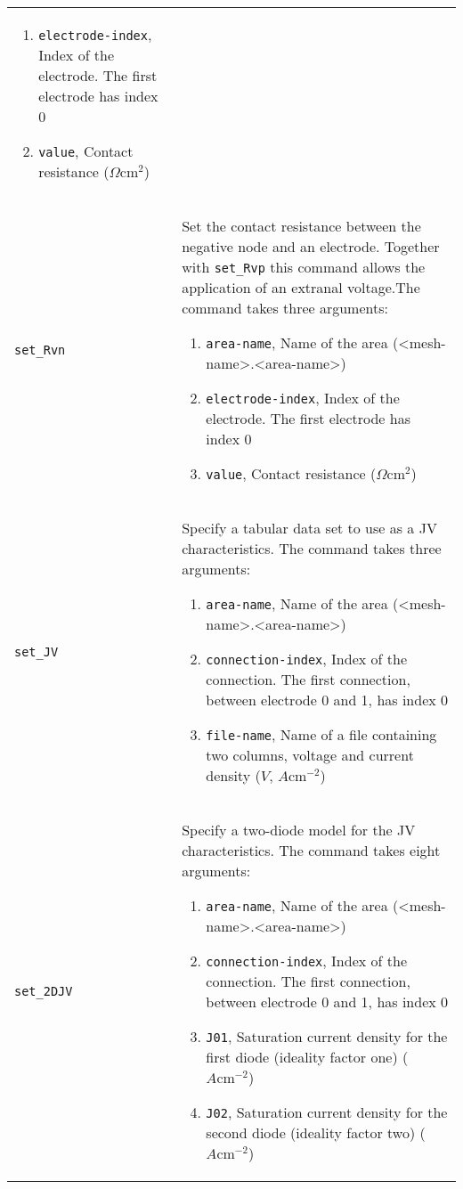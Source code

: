 \documentclass[noshowpacs,preprintnumbers,amsmath,amssymb, letter]{revtex4}
\begin{document}
\begin{longtable}{p{}p{}}
\begin{enumerate}
\item \texttt{electrode-index}, Index of the electrode. The first electrode has index 0
\item \texttt{value}, Contact resistance ($\Omega \text{cm}^2$)
\end{enumerate}\\
\texttt{set\_Rvn}	&  Set the contact resistance between the negative node and an electrode. Together with \texttt{set\_Rvp} this command allows the application of an extranal voltage.The command takes three arguments:
\begin{enumerate}
\item \texttt{area-name}, Name of the area (\textless mesh-name\textgreater .\textless area-name\textgreater )
\item \texttt{electrode-index}, Index of the electrode. The first electrode has index 0
\item \texttt{value}, Contact resistance ($\Omega \text{cm}^2$)
\end{enumerate}\\
\texttt{set\_JV}	&  Specify a tabular data set to use as a JV characteristics. The command takes three arguments:
\begin{enumerate}
\item \texttt{area-name}, Name of the area (\textless mesh-name\textgreater .\textless area-name\textgreater )
\item \texttt{connection-index}, Index of the connection. The first connection, between electrode 0 and 1,  has index 0
\item \texttt{file-name}, Name of a file containing two columns, voltage and current density ($V$, $A \text{cm}^{-2}$)
\end{enumerate}\\
\texttt{set\_2DJV}	&  Specify a two-diode model for the JV characteristics. The command takes eight arguments:
\begin{enumerate}
\item \texttt{area-name}, Name of the area (\textless mesh-name\textgreater .\textless area-name\textgreater )
\item \texttt{connection-index}, Index of the connection. The first connection, between electrode 0 and 1,  has index 0
\item \texttt{J01}, Saturation current density for the first diode (ideality factor one)  ($A \text{cm}^{-2}$)
\item \texttt{J02}, Saturation current density for the second diode (ideality factor two)  ($A \text{cm}^{-2}$)

\end{enumerate}
\end{longtable}
\end{document}
